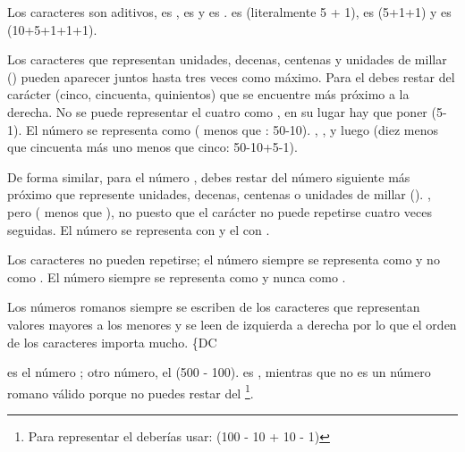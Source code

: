 \begin{itemize}

\item{Los caracteres son aditivos,  es ,  es  y  es .  es  (literalmente 5 + 1),  es  (5+1+1) y  es  (10+5+1+1+1).

\item Los caracteres que representan unidades, decenas, centenas y unidades de millar () pueden aparecer juntos hasta tres veces como máximo. Para el  debes restar del carácter  (cinco, cincuenta, quinientos) que se encuentre más próximo a la derecha. No se puede representar el cuatro como , en su lugar hay que poner  (5-1). El número  se representa como  ( menos que : 50-10). , ,  y luego  (diez menos que cincuenta más uno menos que cinco: 50-10+5-1).

\item De forma similar, para el número , debes restar del número siguiente más próximo que represente unidades, decenas, centenas o unidades de millar (). , pero  ( menos que ), no  puesto que el carácter  no puede repetirse cuatro veces seguidas. El número  se representa con  y el  con .

\item Los caracteres  no pueden repetirse; el número  siempre se representa como  y no como . El número  siempre se representa como  y nunca como .

\item Los números romanos siempre se escriben de los caracteres que representan valores mayores a los menores y se leen de izquierda a derecha por lo que el orden de los caracteres importa mucho. \{DC} es el número ;  otro número, el  (500 - 100).  es , mientras que  no es un número romano válido porque no puedes restar  del \footnote{Para representar el  deberías usar:  (100 - 10 + 10 - 1)}.

\end{itemize}

